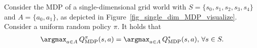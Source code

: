 


\begin{proposition}\label{proposition_single_MDP}
    Consider the MDP of a single-dimensional grid world with $S=\{s_0, s_1, s_2, s_3, s_4\}$ and $A=\{a_0, a_1\}$, as depicted in Figure~\ref{fig_single_dim_MDP_visualize}. Consider a uniform random policy $\pi$. It holds that
    \begin{align}
        \argmax_{ a \in A} \, Q_\text{MDP}^\pi(s, a) = \argmax_{a \in A} \, Q_\text{MDP}^*(s, a), \, \forall s \in S.
    \end{align}
\end{proposition}
%

